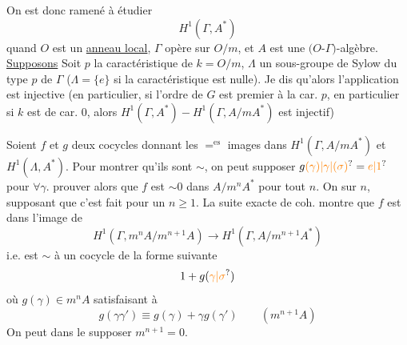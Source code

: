 On est donc ramené à étudier
\[
H^1(\Gamma,A^*)
\]
quand $O$ est un \uline{anneau local}, $\Gamma$ opère \uline{} sur $O/m$, et $A$ est une $(O$-$\Gamma)$-algèbre. \uline{Supposons}   Soit $p$ la caractéristique de $k=O/m$, $\Lambda$ un sous-groupe de Sylow du type $p$ de $\Gamma$ ($\Lambda=\{e\}$ si la caractéristique est nulle).
Je dis qu'alors l'application
est  injective (en particulier, si l'ordre de $G$ est premier à la car. $p$, en particulier si $k$ est de car. $0$, alors $H^1(\Gamma,A^*)\mathbin{-}H^1(\Gamma,A/mA^*)$ est injectif)

Soient $f$ et $g$  deux cocycles donnant les $=^{\mathrm{es}}$ images dans $H^1(\Gamma,A/mA^*)$ et $H^1(\Lambda,A^*)$. Pour montrer qu'ils sont $\sim$, on peut  supposer $g\unsure{(\gamma)|\gamma|(\sigma)}=\unsure{e|1}$ pour $\forall\gamma$.   prouver alors  que $f$ est $\sim0$ dans  $A/m^n A^*$ pour tout $n$. On  sur $n$, supposant que c'est fait pour un $n\geq1$.
La suite exacte de coh. montre que $f$ est dans l'image de
\[
H^1(\Gamma,m^nA/m^{n+1}A)\longrightarrow H^1(\Gamma,A/m^{n+1}A^*)
\]
i.e. est $\sim$  à un cocycle de la forme suivante 
\[
1+g(\unsure{\gamma|\sigma})
\]
où $g(\gamma)\in m^nA$ satisfaisant à
\[
g(\gamma\gamma')\equiv g(\gamma)+\gamma g(\gamma')\qquad(m^{n+1}A)
\]
 On peut dans le  supposer $m^{n+1}=0$.

